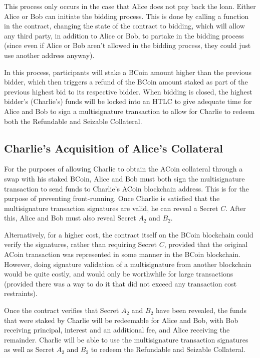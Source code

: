 \documentclass{llncs}
\begin{document}
This process only occurs in the case that Alice does not pay back the loan. Either Alice or Bob can initiate the bidding process. This is done by calling a function in the contract, changing the state of the contract to bidding, which will allow any third party, in addition to Alice or Bob, to partake in the bidding process (since even if Alice or Bob aren't allowed in the bidding process, they could just use another address anyway). 

In this process, participants will stake a BCoin amount higher than the previous bidder, which then triggers a refund of the BCoin amount staked as part of the previous highest bid to its respective bidder. When bidding is closed, the highest bidder’s (Charlie's) funds will be locked into an HTLC to give adequate time for Alice and Bob to sign a multisignature transaction to allow for Charlie to redeem both the Refundable and Seizable Collateral. 

\subsection{Charlie's Acquisition of Alice's Collateral}
For the purposes of allowing Charlie to obtain the ACoin collateral through a swap with his staked BCoin, Alice and Bob must both sign the multisignature transaction to send funds to Charlie's ACoin blockchain address. This is for the purpose of preventing front-running. Once Charlie is satisfied that the multisignature transaction signatures are valid, he can reveal a Secret $C$. After this, Alice and Bob must also reveal Secret $A_2$ and $B_2$.

Alternatively, for a higher cost, the contract itself on the BCoin blockchain could verify the signatures, rather than requiring Secret $C$, provided that the original ACoin transaction was represented in some manner in the BCoin blockchain. However, doing signature validation of a multisignature from another blockchain would be quite costly, and would only be worthwhile for large transactions (provided there was a way to do it that did not exceed any transaction cost restraints). 

Once the contract verifies that Secret $A_2$ and $B_2$ have been revealed, the funds that were staked by Charlie will be redeemable for Alice and Bob, with Bob receiving principal, interest and an additional fee, and Alice receiving the remainder. Charlie will be able to use the multisignature transaction signatures as well as Secret $A_2$ and $B_2$ to redeem the Refundable and Seizable Collateral. 
\end{document}
